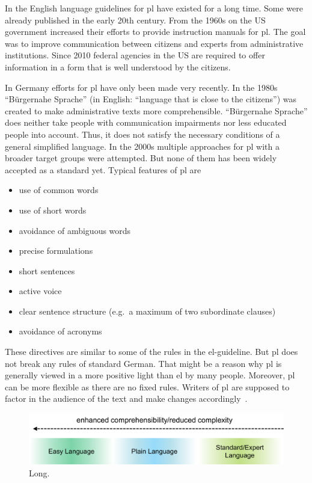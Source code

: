 In the English language guidelines for \gls{pl} have existed for a long time.
Some were already published in the early 20th century.
From the 1960s on the US government increased their efforts to provide instruction manuals for \gls{pl}.
The goal was to improve communication between citizens and experts from administrative institutions.
Since 2010 federal agencies in the US are required to offer information in a form that is well understood by the citizens.

In Germany efforts for \gls{pl} have only been made very recently.
In the 1980s \enquote{Bürgernahe Sprache} (in English: \enquote{language that is close to the citizens}) was created to make administrative texts more comprehensible.
\enquote{Bürgernahe Sprache} does neither take people with communication impairments nor less educated people into account.
Thus, it does not satisfy the necessary conditions of a general simplified language.
In the 2000s multiple approaches for \gls{pl} with a broader target groups were attempted.
But none of them has been widely accepted as a standard yet.
Typical features of \gls{pl} are
\begin{itemize}[noitemsep]
    \item use of common words
    \item use of short words
    \item avoidance of ambiguous words
    \item precise formulations
    \item short sentences
    \item active voice
    \item clear sentence structure (e.g.\ a maximum of two subordinate clauses)
    \item avoidance of acronyms
 \end{itemize}
These directives are similar to some of the rules in the \gls{el}-guideline.
But \gls{pl} does not break any rules of standard German.
That might be a reason why \gls{pl} is generally viewed in a more positive light than \gls{el} by many people. %
Moreover, \gls{pl} can be more flexible as there are no fixed rules.
Writers of \gls{pl} are supposed to factor in the audience of the text and make changes accordingly~\autocite{easyLanguageBook}.

\begin{figure}
    \centering
    \includegraphics[width=\linewidth]{images/easy_languages}
    \caption[Short.]{Long.}
    \label{fig:languages}
\end{figure}

